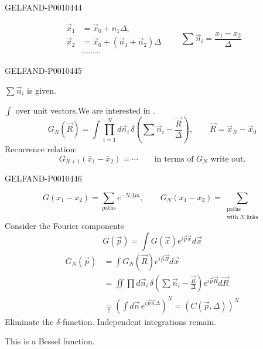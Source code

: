 \begin{GelfandAdjacentEvidence}{GELFAND-P001044}{4}

\[
\begin{aligned}
\vec{x}_1&=\vec{x}_0+n_1\Delta,\\
\vec{x}_2&=\vec{x}_0+(\vec{n}_1+\vec{n}_2)\Delta\\
&\cdots\cdots\cdots
\end{aligned}
\qquad
\sum\vec{n}_i=\frac{x_1-x_2}{\Delta}
\]
\end{GelfandAdjacentEvidence}
\begin{GelfandAdjacentEvidence}{GELFAND-P001044}{5}


$\sum\vec{n}_i$ is given.

$\int$ over unit vectors.\quad We are interested in .
\begin{equation*}
G_N(\vec{R})=\int\prod_{i=1}^{N}d\vec{n}_i\,
\delta\left(\sum\vec{n}_i-\frac{\vec{R}}{\Delta}\right),
\qquad\vec{R}=\vec{x}_N-\vec{x}_0
\tag{15}
\end{equation*}
Recurrence relation:
\[
G_{N+1}(\bar{x}_1-\bar{x}_2)=\cdots
\qquad\text{in terms of }G_N\text{ write out}.
\]
\end{GelfandAdjacentEvidence}
\begin{GelfandAdjacentEvidence}{GELFAND-P001044}{6}

\begin{equation*}
G(x_1-x_2)=\sum_{\text{paths}}e^{-N\Delta m},
\qquad
G_N(x_1-x_2)=\sum_{\substack{\text{paths}\\\text{with }N\text{ links}}}
\tag{16}
\end{equation*}
Consider the Fourier components
\begin{equation*}
G(\vec{p})=\int G(\vec{x})e^{i\vec{p}\vec{x}}d\vec{x}
\tag{17}
\end{equation*}
\begin{equation*}
\begin{aligned}
G_N(\vec{p})&=\int G_N(\vec{R})e^{i\vec{p}\vec{R}}d\vec{x}\\
&=\iint\prod d\vec{n}_i\,
\delta\left(\sum\vec{n}_i-\frac{\vec{R}}{\Delta}\right)
e^{i\vec{p}\vec{R}}d\vec{R}\\
&\underset{\uparrow}{=}
\left(\int d\vec{n}\,e^{i\vec{p}\vec{n}\Delta}\right)^N
=(C(\vec{p},\Delta))^N
\end{aligned}
\tag{18}
\end{equation*}
Eliminate the $\delta$-function. Independent integrations remain.

This is a Bessel function.
\end{GelfandAdjacentEvidence}
